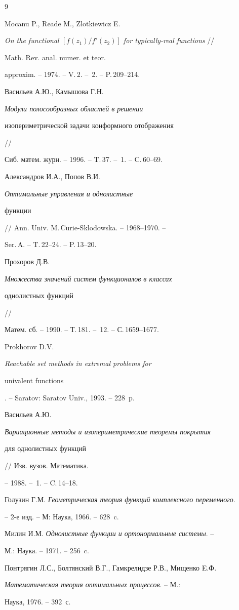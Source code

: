 \begin{thebibliography}{9}







Mocanu P., Reade M., Zlotkiewicz E.


{\em On the functional $[f(z_1)/f'(z_2)]$ for typically-real functions} //


Math. Rev. anal. numer. et teor.


approxim. -- 1974. -- V.\,2. -- \No\,2. -- P.\,209--214.




Васильев А.Ю., Камышова Г.Н. {\em Модули полосообразных областей в решении


изопериметрической задачи конформного отображения} //


Сиб. матем. журн. -- 1996. -- T.\,37. -- \No\,1. -- C.\,60--69.




Александров И.А., Попов В.И. {\em Оптимальные управления и однолистные


функции} // Ann. Univ. M.\,Curie-Sklodowska. -- 1968--1970. --


Ser.\,A. -- T.\,22--24. -- P.\,13--20.




Прохоров Д.В. {\em Множества значений систем функционалов в классах 


однолистных функций} //


Матем. сб. -- 1990. -- Т.\,181. -- \No\,12. -- С.\,1659--1677.




Prokhorov D.V. {\em Reachable set methods in extremal problems for 


univalent functions}. -- Saratov: Saratov Univ., 1993. -- 228~p.




Васильев А.Ю. {\em Вариационные методы и изопериметрические теоремы покрытия


для однолистных функций} // Изв. вузов. Математика.


-- 1988. -- \No\,1. -- C.\,14--18.




Голузин Г.М. {\em Геометрическая теория функций комплексного переменного}.


-- 2-е изд. -- М: Наука, 1966. -- 628~c.




Милин И.М. {\em Однолистные функции и ортонормальные системы}. --


М.: Наука. -- 1971. -- 256~c.




Понтрягин Л.С., Болтянский В.Г., Гамкрелидзе Р.В., Мищенко E.Ф.


{\em Математическая теория оптимальных процессов}. -- М.:


Наука, 1976. -- 392~с.





\end{thebibliography}





